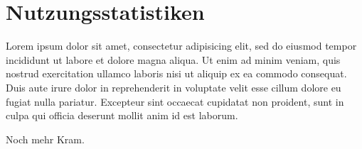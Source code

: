\chapter{Nutzungsstatistiken} %
\label{cha:nutzungsstatistiken}

Lorem ipsum dolor sit amet, consectetur adipisicing elit, sed do eiusmod tempor incididunt ut labore et dolore magna aliqua. Ut enim ad minim veniam, quis nostrud exercitation ullamco laboris nisi ut aliquip ex ea commodo consequat. Duis aute irure dolor in reprehenderit in voluptate velit esse cillum dolore eu fugiat nulla pariatur. Excepteur sint occaecat cupidatat non proident, sunt in culpa qui officia deserunt mollit anim id est laborum.

Noch mehr Kram.


